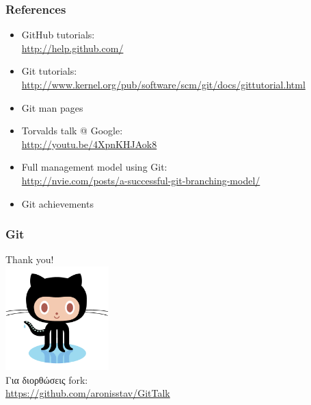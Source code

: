 \documentclass[handout]{beamer}
\begin{document}
\begin{frame}
  \frametitle{References}
  \begin{itemize}
    \item GitHub tutorials: \\
      \url{http://help.github.com/}
    \item Git tutorials: \\
      \url{http://www.kernel.org/pub/software/scm/git/docs/gittutorial.html}
    \item Git man pages
    \item Torvalds talk @ Google: \\
      \url{http://youtu.be/4XpnKHJAok8}
    \item Full management model using Git: \\
      \url{http://nvie.com/posts/a-successful-git-branching-model/}
    \item Git achievements
  \end{itemize}
\end{frame}

\begin{frame}
  \frametitle{Git}
    \begin{center}
      Thank you! \\
      \includegraphics[height=4cm]{Octocat.png} \\
      \small{Για διορθώσεις fork:
        \\ \url{https://github.com/aronisstav/GitTalk}}

    \end{center}
\end{frame}
\end{document}
